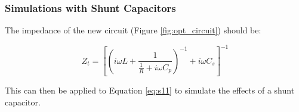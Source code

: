 \documentclass{beamer}
\begin{document}
\begin{frame}
\begin{columns}
\begin{column}{0.6\textwidth}

        \end{column}
    \end{columns}


\end{frame}

\begin{frame}
    \frametitle{Simulations with Shunt Capacitors}

    The impedance of the new circuit (Figure \ref{fig:opt_circuit}) should be:

    \begin{equation}
        Z_t = \left[ \left(i\omega L + \frac1{\frac1R + i\omega C_p}\right)^{-1} + i\omega C_s \right]^{-1}
        \label{eq:zt}
    \end{equation}

    This can then be applied to Equation \ref{eq:s11} to simulate the effects of a shunt capacitor.

\end{frame}
\end{document}
